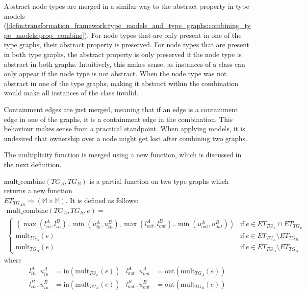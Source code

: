 Abstract node types are merged in a similar way to the abstract property in type models (\cref{defin:transformation_framework:type_models_and_type_graphs:combining_type_models:prop_combine}). For node types that are only present in one of the type graphs, their abstract property is preserved. For node types that are present in both type graphs, the abstract property is only preserved if the node type is abstract in both graphs. Intuitively, this makes sense, as instances of a class can only appear if the node type is not abstract. When the node type was not abstract in one of the type graphs, making it abstract within the combination would make all instances of the class invalid.

Containment edges are just merged, meaning that if an edge is a containment edge in one of the graphs, it is a containment edge in the combination. This behaviour makes sense from a practical standpoint. When applying models, it is undesired that ownership over a node might get lost after combining two graphs.

The multiplicity function is merged using a new function, which is discussed in the next definition.

\begin{defin}
\label{defin:transformation_framework:type_models_and_type_graphs:combining_type_graphs:mult_combine}
$\mathrm{mult\_\!combine}(TG_A, TG_B)$ is a partial function on two type graphs which returns a new function \\$ET_{TG_{AB}} \Rightarrow (\mathbb{M} \times \mathbb{M})$. It is defined as follows:
\begin{multline*}
    \mathrm{mult\_\!combine}(TG_{A}, TG_{B}, e) = \\
    \begin{cases}
        ( \max(l_{in}^A, l_{in}^B)..\min(u_{in}^A, u_{in}^B), \max(l_{out}^A, l_{out}^B)..\min(u_{out}^A, u_{out}^B) ) & \mathrm{if }\ e \in ET_{TG_A} \cap ET_{TG_B} \\
        \mathrm{mult}_{TG_A}(e) & \mathrm{if }\ e \in ET_{TG_A} \setminus ET_{TG_B} \\
        \mathrm{mult}_{TG_B}(e) & \mathrm{if }\ e \in ET_{TG_B} \setminus ET_{TG_A}
    \end{cases}
\end{multline*}
where
\begin{align*}
    l_{in}^A .. u_{in}^A &= \mathrm{in}(\mathrm{mult}_{TG_A}(e)) &
    l_{out}^A .. u_{out}^A &= \mathrm{out}(\mathrm{mult}_{TG_A}(e)) \\
    l_{in}^B .. u_{in}^B &= \mathrm{in}(\mathrm{mult}_{TG_B}(e)) &
    l_{out}^B .. u_{out}^B &= \mathrm{out}(\mathrm{mult}_{TG_B}(e))
\end{align*}
\end{defin}

